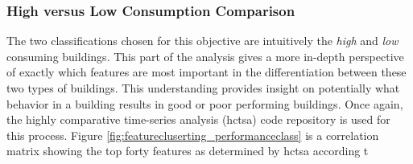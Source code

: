 \subsubsection{High versus Low Consumption Comparison}
\label{sec:highvslow}

The two classifications chosen for this objective are intuitively the \emph{high} and \emph{low} consuming buildings. This part of the analysis gives a more in-depth perspective of exactly which features are most important in the differentiation between these two types of buildings. This understanding provides insight on potentially what behavior in a building results in good or poor performing buildings. Once again, the highly comparative time-series analysis (hctsa) code repository is used for this process. Figure \ref{fig:featurecluserting_performanceclass} is a correlation matrix showing the top forty features as determined by hctsa according t

